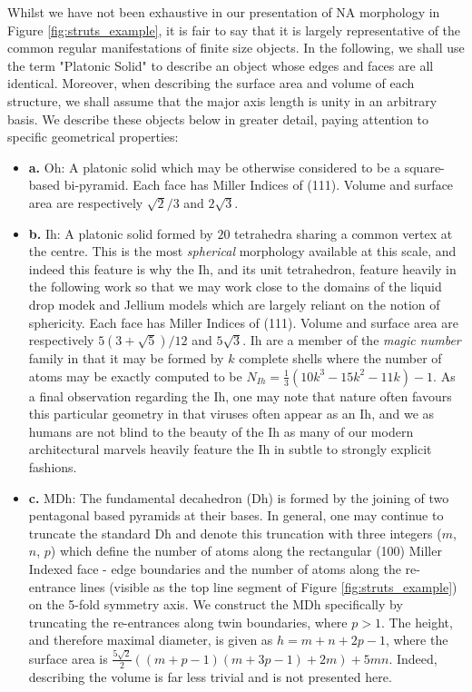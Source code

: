 Whilst we have not been exhaustive in our presentation of NA morphology in Figure \ref{fig:struts_example}, it is fair to say that it is largely representative of the common regular manifestations of finite size objects. In the following, we shall use the term "Platonic Solid" to describe an object whose edges and faces are all identical. Moreover, when describing the surface area and volume of each structure, we shall assume that the major axis length is unity in an arbitrary basis. We describe these objects below in greater detail, paying attention to specific geometrical properties: 

\begin{itemize}
    \item \textbf{a.} Oh: A platonic solid which may be otherwise considered to be a square-based bi-pyramid. Each face has Miller Indices of (111). Volume and surface area are respectively $\sqrt{2}/3$ and $2\sqrt{3}$.
    \item \textbf{b.} Ih: A platonic solid formed by $20$ tetrahedra sharing a common vertex at the centre. This is the most \textit{spherical} morphology available at this scale, and indeed this feature is why the Ih, and its unit tetrahedron, feature heavily in the following work so that we may work close to the domains of the liquid drop modek and Jellium models which are largely reliant on the notion of sphericity. Each face has Miller Indices of (111). Volume and surface area are respectively $5(3+\sqrt{5})/12$ and $5\sqrt{3}$. Ih are a member of the \textit{magic number} family in that it may be formed by $k$ complete shells where the number of atoms may be exactly computed to be $N_{Ih} = \frac{1}{3} ( 10k^{3} - 15k^{2} - 11k) - 1$. As a final observation regarding the Ih, one may note that nature often favours this particular geometry in that viruses often appear as an Ih, and we as humans are not blind to the beauty of the Ih as many of our modern architectural marvels heavily feature the Ih in subtle to strongly explicit fashions.
    \item \textbf{c.} MDh: The fundamental decahedron (Dh) is formed by the joining of two pentagonal based pyramids at their bases. In general, one may continue to truncate the standard Dh and denote this truncation with three integers ($m$, $n$, $p$) which define the number of atoms along the rectangular (100) Miller Indexed face - edge boundaries and the number of atoms along the re-entrance lines (visible as the top line segment of Figure \ref{fig:struts_example}) on the 5-fold symmetry axis. We construct the MDh specifically by truncating the re-entrances along twin boundaries, where $p>1$. The height, and therefore maximal diameter, is given as $h = m+n+2p -1$, where the surface area is $\frac{5\sqrt{2}}{2} ((m+p-1)(m+3p-1) + 2m) + 5mn$. Indeed, describing the volume is far less trivial and is not presented here.

\end{itemize}
